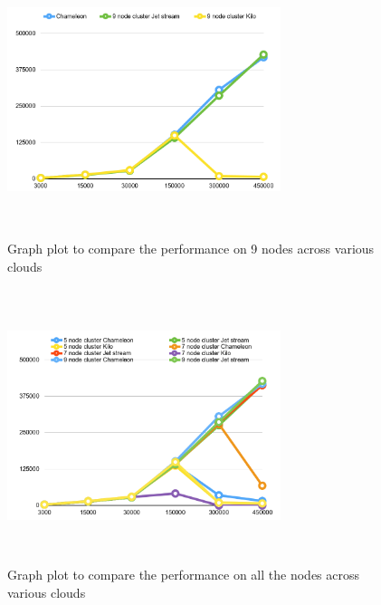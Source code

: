 \documentclass[9pt,twocolumn,twoside]{../../styles/osajnl}
\begin{document}
\begin{figure}[!htb]
  \includegraphics[width=8cm,height=8cm,keepaspectratio,width=\linewidth]{images/bench2-3.PNG}
  \caption{Graph plot to compare the performance on 9 nodes across various clouds}
  \label{9c}
\end{figure}

\begin{figure}[!htb]
  \includegraphics[width=8cm,height=8cm,keepaspectratio,width=\linewidth]{images/bench2-4.PNG}
  \caption{Graph plot to compare the performance on all the nodes across various clouds}
  \label{ac}
\end{figure}
\end{document}
